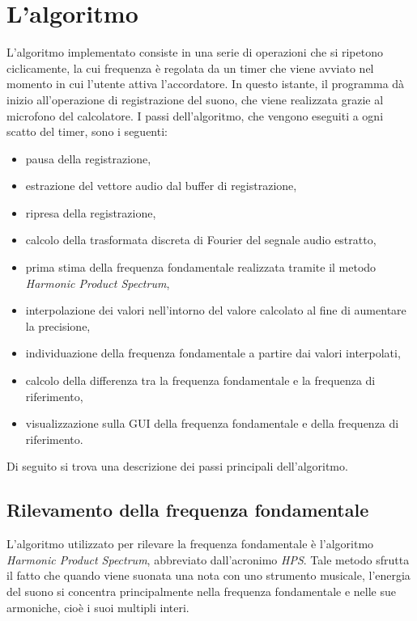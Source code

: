 \chapter{L'algoritmo}

L'algoritmo implementato consiste in una serie di operazioni che si ripetono ciclicamente, la cui frequenza è regolata da un timer che viene avviato nel momento in cui l'utente attiva l'accordatore.
In questo istante, il programma dà inizio all'operazione di registrazione del suono, che viene realizzata grazie al microfono del calcolatore. 
I passi dell'algoritmo, che vengono eseguiti a ogni scatto del timer, sono i seguenti:
\begin{itemize}
	\item pausa della registrazione,
	\item estrazione del vettore audio dal buffer di registrazione, 
	\item ripresa della registrazione,
	\item calcolo della trasformata discreta di Fourier del segnale audio estratto,
	\item prima stima della frequenza fondamentale realizzata tramite il metodo \emph{Harmonic Product Spectrum},
	\item interpolazione dei valori nell'intorno del valore calcolato al fine di aumentare la precisione,
	\item individuazione della frequenza fondamentale a partire dai valori interpolati,
	\item calcolo della differenza tra la frequenza fondamentale e la frequenza di riferimento,
	\item visualizzazione sulla GUI della frequenza fondamentale e della frequenza di riferimento.
\end{itemize}

Di seguito si trova una descrizione dei passi principali dell'algoritmo.

	\section{Rilevamento della frequenza fondamentale}\label{cap:rilevamento_frequenza}
	L'algoritmo utilizzato per rilevare la frequenza fondamentale è l'algoritmo \emph{Harmonic Product Spectrum}, abbreviato dall'acronimo \emph{HPS}.
	Tale metodo sfrutta il fatto che quando viene suonata una nota con uno strumento musicale, l'energia del suono si concentra principalmente nella frequenza fondamentale e nelle sue armoniche, cioè i suoi multipli interi.

